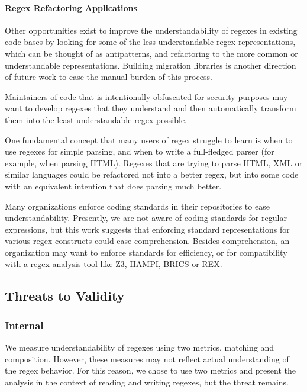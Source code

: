 \paragraph{Regex Refactoring Applications}
Other opportunities exist to improve the understandability of regexes in existing code bases by looking for some of the less understandable regex representations, which can be thought of as antipatterns, and refactoring to the more common or understandable representations. Building migration libraries is another direction of future work to ease the manual burden of this process.

Maintainers of code that is intentionally obfuscated for security purposes may want to develop regexes that they understand and then automatically transform them into the least understandable regex possible.

One fundamental concept that many users of regex struggle to learn is when to use regexes for simple parsing, and when to write a full-fledged parser (for example, when parsing HTML).  Regexes that are trying to parse HTML, XML or similar languages could be refactored not into a better regex, but into some code with an equivalent intention that does parsing much better.

Many organizations enforce coding standards in their repositories to ease understandability.
Presently, we are not aware of coding standards for regular expressions, but this work suggests that enforcing standard representations for various regex constructs could ease comprehension.  Besides comprehension, an organization may want to enforce standards for efficiency, or for compatibility with a regex analysis tool like Z3, HAMPI, BRICS or REX.

\subsection{Threats to Validity}

\subsubsection{Internal}
We measure understandability of regexes using two metrics, matching and composition. However, these measures may not reflect actual understanding of the regex behavior. For this reason, we chose to use two metrics and present the analysis in the context of reading and writing regexes, but the threat remains.


